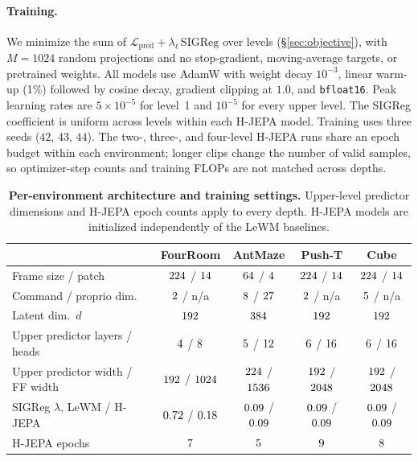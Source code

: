 \paragraph{Training.} We minimize the sum of
$\mathcal{L}_{\mathrm{pred}}+\lambda_\ell\,\mathrm{SIGReg}$ over levels
(\S\ref{sec:objective}), with $M=1024$ random projections and no stop-gradient,
moving-average targets, or pretrained weights. All models use AdamW with weight
decay $10^{-3}$, linear warm-up (1\%) followed by cosine decay, gradient clipping at
$1.0$, and \texttt{bfloat16}. Peak learning rates are $5\times10^{-5}$ for level~1
and $10^{-5}$ for every upper level. The SIGReg coefficient is uniform across
levels within each H-JEPA model. Training uses three seeds ($42$, $43$, $44$).
The two-, three-, and four-level H-JEPA runs share an epoch budget within each
environment; longer clips change the number of valid samples, so optimizer-step
counts and training FLOPs are not matched across depths.

\begin{table}[ht]
\centering
\small
\setlength{\tabcolsep}{5pt}
\caption{\textbf{Per-environment architecture and training settings.} Upper-level
predictor dimensions and H-JEPA epoch counts apply to every depth. H-JEPA models
are initialized independently of the LeWM baselines.}
\label{tab:impl-training}
\begin{tabular}{lcccc}
\toprule
 & FourRoom & AntMaze & Push-T & Cube \\
\midrule
Frame size / patch & $224$ / $14$ & $64$ / $4$ & $224$ / $14$ & $224$ / $14$ \\
Command / proprio dim. & $2$ / n/a & $8$ / $27$ & $2$ / n/a & $5$ / n/a \\
Latent dim.\ $d$ & $192$ & $384$ & $192$ & $192$ \\
Upper predictor layers / heads & $4$ / $8$ & $5$ / $12$ & $6$ / $16$ & $6$ / $16$ \\
Upper predictor width / FF width & $192$ / $1024$ & $224$ / $1536$ & $192$ / $2048$ & $192$ / $2048$ \\
\midrule
SIGReg $\lambda$, LeWM / H-JEPA & $0.72$ / $0.18$ & $0.09$ / $0.09$ & $0.09$ / $0.09$ & $0.09$ / $0.09$ \\
H-JEPA epochs & $7$ & $5$ & $9$ & $8$ \\
\bottomrule
\end{tabular}
\end{table}


